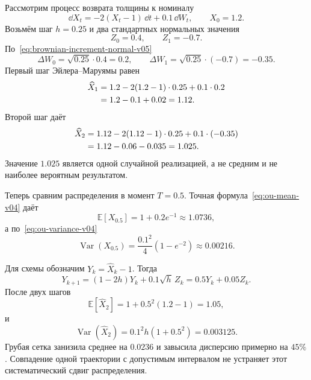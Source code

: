 Рассмотрим процесс возврата толщины к номиналу
\begin{equation}
\label{eq:ou-em-example-sde-v05}
\dd X_t
=
-2(X_t-1)\,\dd t
+
0.1\,\dd W_t,
\qquad
X_0=1.2.
\end{equation}
Возьмём шаг $h=0.25$ и два стандартных нормальных значения
\begin{equation}
\label{eq:ou-em-example-noise-v05}
Z_0=0.4,
\qquad
Z_1=-0.7.
\end{equation}
По~\eqref{eq:brownian-increment-normal-v05}
\[
\Delta W_0=\sqrt{0.25}\cdot0.4=0.2,
\qquad
\Delta W_1=\sqrt{0.25}\cdot(-0.7)=-0.35.
\]
Первый шаг Эйлера--Маруямы равен
\begin{align}
\widehat X_1
&=
1.2-2(1.2-1)\cdot0.25+0.1\cdot0.2
\notag\\
&=
1.2-0.1+0.02
=
1.12.
\label{eq:ou-em-example-step1-v05}
\end{align}
Второй шаг даёт
\begin{align}
\widehat X_2
&=
1.12-2(1.12-1)\cdot0.25+0.1\cdot(-0.35)
\notag\\
&=
1.12-0.06-0.035
=
1.025.
\label{eq:ou-em-example-step2-v05}
\end{align}
Значение $1.025$ является одной случайной реализацией, а не средним и не наиболее вероятным результатом.

Теперь сравним распределения в момент $T=0.5$. Точная формула~\eqref{eq:ou-mean-v04} даёт
\begin{equation}
\label{eq:ou-em-exact-mean-v05}
\mathbb E[X_{0.5}]
=
1+0.2e^{-1}
\approx1.0736,
\end{equation}
а по~\eqref{eq:ou-variance-v04}
\begin{equation}
\label{eq:ou-em-exact-variance-v05}
\operatorname{Var}(X_{0.5})
=
\frac{0.1^2}{4}\left(1-e^{-2}\right)
\approx0.00216.
\end{equation}

Для схемы обозначим $Y_k=\widehat X_k-1$. Тогда
\begin{equation}
\label{eq:ou-em-ar1-v05}
Y_{k+1}
=
(1-2h)Y_k+0.1\sqrt h\,Z_k
=
0.5Y_k+0.05Z_k.
\end{equation}
После двух шагов
\begin{equation}
\label{eq:ou-em-two-step-mean-v05}
\mathbb E[\widehat X_2]
=
1+0.5^2(1.2-1)
=
1.05,
\end{equation}
и
\begin{equation}
\label{eq:ou-em-two-step-variance-v05}
\operatorname{Var}(\widehat X_2)
=
0.1^2 h\left(1+0.5^2\right)
=
0.003125.
\end{equation}
Грубая сетка занизила среднее на $0.0236$ и завысила дисперсию примерно на $45\%$. Совпадение одной траектории с допустимым интервалом не устраняет этот систематический сдвиг распределения.

